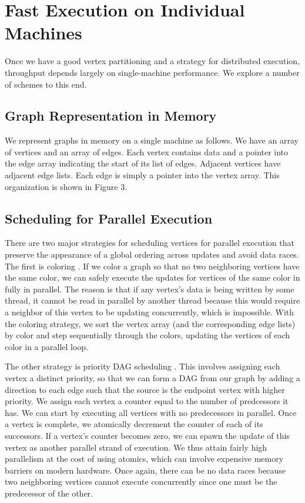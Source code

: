 \section{Fast Execution on Individual Machines}

Once we have a good vertex partitioning and a strategy for distributed execution, throughput depends largely on single-machine performance. We explore a number of schemes to this end.


\subsection{Graph Representation in Memory}
We represent graphs in memory on a single machine as follows. We have an array of vertices and an array of edges. Each vertex contains data and a pointer into the edge array indicating the start of its list of edges. Adjacent vertices have adjacent edge lists. Each edge is simply a pointer into the vertex array. This organization is shown in Figure 3.

\subsection{Scheduling for Parallel Execution}
There are two major strategies for scheduling vertices for parallel execution that preserve the appearance of a global ordering across updates and avoid data races. The first is coloring \cite{chromatic}. If we color a graph so that no two neighboring vertices have the same color, we can safely execute the updates for vertices of the same color in fully in parallel. The reason is that if any vertex's data is being written by some thread, it cannot be read in parallel by another thread because this would require a neighbor of this vertex to be updating concurrently, which is impossible. With the coloring strategy, we sort the vertex array (and the corresponding edge lists) by color and step sequentially through the colors, updating the vertices of each color in a parallel loop.

The other strategy is priority DAG scheduling \cite{dag}. This involves assigning each vertex a distinct priority, so that we can form a DAG from our graph by adding a direction to each edge such that the source is the endpoint vertex with higher priority. We assign each vertex a counter equal to the number of predcessors it has. We can start by executing all vertices with no predecessors in parallel. Once a vertex is complete, we atomically decrement the counter of each of its successors. If a vertex's counter becomes zero, we can spawn the update of this vertex as another parallel strand of execution. We thus attain fairly high parallelism at the cost of using atomics, which can involve expensive memory barriers on modern hardware. Once again, there can be no data races because two neighboring vertices cannot execute concurrently since one must be the predecessor of the other.

